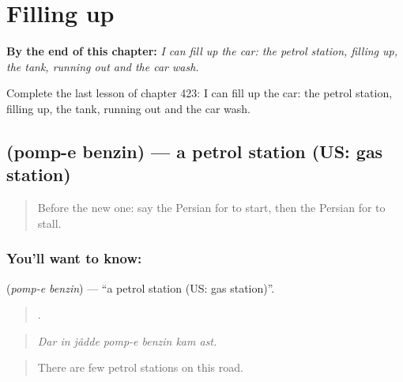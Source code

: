 
\chapter{Filling up}
\label{ch:fa-filling-up}

\begin{chapteropening}
\textbf{By the end of this chapter:} \emph{I can fill up the car: the petrol station, filling up, the tank, running out and the car wash.}

Complete the last lesson of chapter 423: I can fill up the car: the petrol station, filling up, the tank, running out and the car wash.
\end{chapteropening}

\section[\texorpdfstring{\fa{پمپ} \fa{بنزین} (pomp-e benzin)}{پمپ بنزین (pomp-e benzin)}]{  (pomp-e benzin) — a petrol station (US: gas station)}

\label{lesson:FA-C423-pomp-e-benzin}



\begin{quote}
Before the new one: say the Persian for to start, then the Persian for to stall.
\end{quote}

\subsection*{You'll want to know:  }
\textbf{ } (\emph{pomp-e benzin}) — \textquotedblleft{}a petrol station (US: gas station)\textquotedblright{}.

\begin{quote}
      .
\end{quote}

\begin{quote}
\emph{Dar in jâdde pomp-e benzin kam ast.}
\end{quote}

\begin{quote}
There are few petrol stations on this road.
\end{quote}

